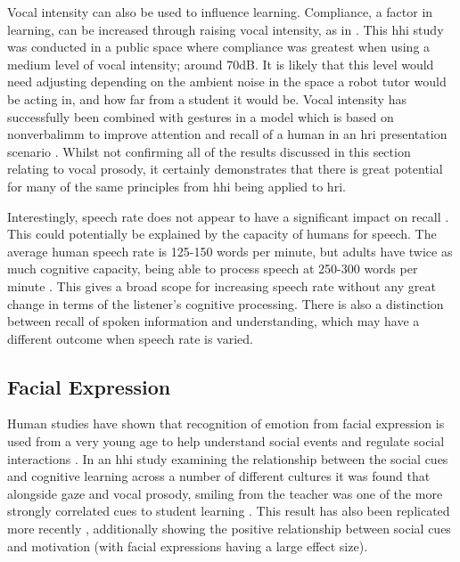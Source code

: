 Vocal intensity can also be used to influence learning. Compliance, a factor in learning, can be increased through raising vocal intensity, as in \cite{remland1994influence}. This \acrshort{hhi} study was conducted in a public space where compliance was greatest when using a medium level of vocal intensity; around 70dB. It is likely that this level would need adjusting depending on the ambient noise in the space a robot tutor would be acting in, and how far from a student it would be. Vocal intensity has successfully been combined with gestures in a model which is based on \gls{nonverbalimm} to improve attention and recall of a human in an \acrshort{hri} presentation scenario \citep{szafir2012pay}. Whilst not confirming all of the results discussed in this section relating to vocal prosody, it certainly demonstrates that there is great potential for many of the same principles from \acrshort{hhi} being applied to \acrshort{hri}.

Interestingly, speech rate does not appear to have a significant impact on recall \citep{simonds2006effects}. This could potentially be explained by the capacity of humans for speech. The average human speech rate is 125-150 words per minute, but adults have twice as much cognitive capacity, being able to process speech at 250-300 words per minute \citep{fulford1992systematically}. This gives a broad scope for increasing speech rate without any great change in terms of the listener's cognitive processing. There is also a distinction between recall of spoken information and understanding, which may have a different outcome when speech rate is varied.

\subsection{Facial Expression} \label{sec:background-expression}
Human studies have shown that recognition of emotion from facial expression is used from a very young age to help understand social events and regulate social interactions \citep{tronick1989emotions,zarbatany1985social}. In an \acrshort{hhi} study examining the relationship between the social cues and cognitive learning across a number of different cultures it was found that alongside gaze and vocal prosody, smiling from the teacher was one of the more strongly correlated cues to student learning \citep{mccroskey1996nonverbal}. This result has also been replicated more recently \citep{velez2008relationship}, additionally showing the positive relationship between social cues and motivation (with facial expressions having a large effect size).

